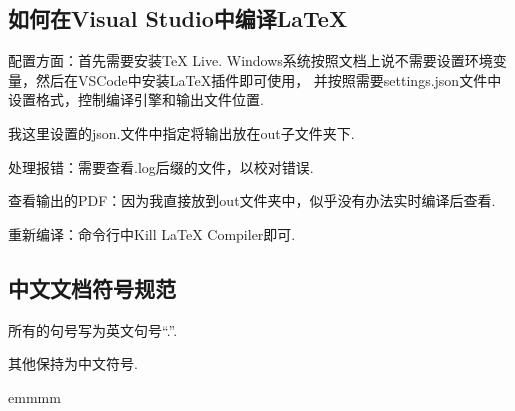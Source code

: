 \documentclass[12pt]{article}
\begin{document}
\subsection*{如何在Visual Studio中编译\LaTeX}

配置方面：首先需要安装TeX Live. Windows系统按照文档上说不需要设置环境变量，然后在VSCode中安装LaTeX插件即可使用，
并按照需要settings.json文件中设置格式，控制编译引擎和输出文件位置.

我这里设置的json.文件中指定将输出放在out子文件夹下.

处理报错：需要查看.log后缀的文件，以校对错误.

查看输出的PDF：因为我直接放到out文件夹中，似乎没有办法实时编译后查看.

重新编译：命令行中Kill LaTeX Compiler即可.

\subsection*{中文文档符号规范}

所有的句号写为英文句号“.”. 

其他保持为中文符号.

\break

emmmm
\end{document}
